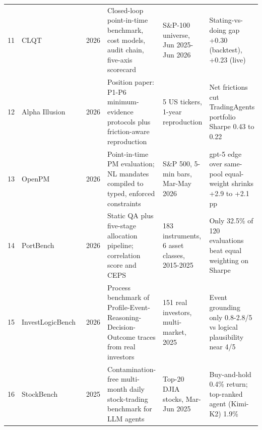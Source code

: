 \begin{table}[!p]
\begin{tabularx}{\textwidth}{r p{2.5cm} c Y p{2.6cm} Y}
11 & CLQT~\cite{clqt} & 2026 & Closed-loop point-in-time benchmark, cost models, audit chain, five-axis scorecard & S\&P-100 universe, Jun 2025-Jun 2026 & Stating-vs-doing gap +0.30 (backtest), +0.23 (live) \\
12 & Alpha Illusion~\cite{alphaillusion} & 2026 & Position paper: P1-P6 minimum-evidence protocols plus friction-aware reproduction & 5 US tickers, 1-year reproduction & Net frictions cut TradingAgents portfolio Sharpe 0.43 to 0.22 \\
13 & OpenPM~\cite{openpm} & 2026 & Point-in-time PM evaluation; NL mandates compiled to typed, enforced constraints & S\&P 500, 5-min bars, Mar-May 2026 & gpt-5 edge over same-pool equal-weight shrinks +2.9 to +2.1 pp \\
14 & PortBench~\cite{portbench} & 2026 & Static QA plus five-stage allocation pipeline; correlation score and CEPS & 183 instruments, 6 asset classes, 2015-2025 & Only 32.5\% of 120 evaluations beat equal weighting on Sharpe \\
15 & InvestLogic\-Bench~\cite{investlogicbench} & 2026 & Process benchmark of Profile-Event-Reasoning-Decision-Outcome traces from real investors & 151 real investors, multi-market, 2025 & Event grounding only 0.8-2.8/5 vs logical plausibility near 4/5 \\
16 & StockBench~\cite{stockbench} & 2025 & Contamination-free multi-month daily stock-trading benchmark for LLM agents & Top-20 DJIA stocks, Mar-Jun 2025 & Buy-and-hold 0.4\% return; top-ranked agent (Kimi-K2) 1.9\% \\
\bottomrule
\end{tabularx}
\end{table}
